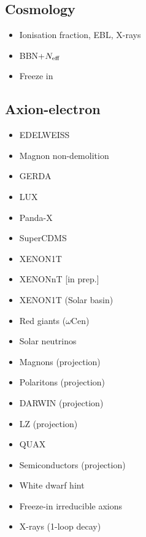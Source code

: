 \documentclass[10pt,twocolumn]{extarticle}
\begin{document}
\begin{mdframed}[everyline=true]
\subsection*{Cosmology}\vspace{-0.5em}
\begin{itemize}\setlength\itemsep{-0.5em}
    \item Ionisation fraction, EBL, X-rays~\cite{Cadamuro:2011fd}
    \item BBN+$N_{\rm eff}$~\cite{Depta:2020wmr}
    \item Freeze in~\cite{Langhoff:2022bij}
\end{itemize}
\end{mdframed}

\newpage

\begin{mdframed}
\vspace{-1em}
\section{Axion-electron}\vspace{-0.5em}
\begin{itemize}\setlength\itemsep{-0.5em}
    \item EDELWEISS~\cite{EDELWEISS:2018tde}
    \item Magnon non-demolition~\cite{Ikeda:2021mlv}
    \item GERDA~\cite{GERDA:2020emj}
    \item LUX~\cite{LUX:2017glr}
    \item Panda-X~\cite{PandaX:2017ock}
    \item SuperCDMS~\cite{SuperCDMS:2019jxx}
    \item XENON1T~\cite{XENON:2019gfn,XENON:2020rca}
    \item XENONnT [in prep.]
    \item XENON1T (Solar basin)~\cite{VanTilburg:2020jvl}
    \item Red giants ($\omega$Cen)~\cite{Capozzi:2020cbu}
    \item Solar neutrinos~\cite{Gondolo:2008dd}
    \item Magnons (projection)~\cite{Chigusa:2020gfs}
        \item Polaritons (projection)~\cite{Mitridate:2020kly}
    \item DARWIN (projection)~\cite{DARWIN:2016hyl}
    \item LZ (projection)~\cite{LZ:2021xov}
    \item QUAX~\cite{Crescini:2018qrz,QUAX:2020adt}
  	\item Semiconductors (projection)~\cite{Bloch:2016sjj}
  	\item White dwarf hint~\cite{Giannotti:2017hny}
  	\item Freeze-in irreducible axions~\cite{Langhoff:2022bij}
  	\item X-rays (1-loop decay)~\cite{Ferreira:2022egk}
\end{itemize}
\end{mdframed}
\end{document}
